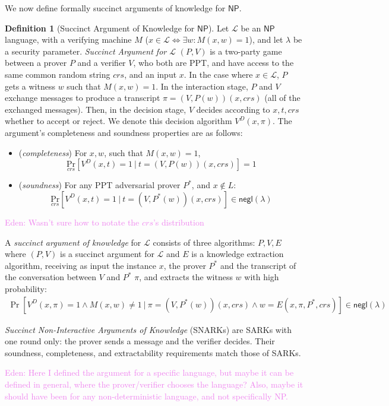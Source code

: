 \documentclass{llncs}
\numberwithin{equation}{section}
\numberwithin{figure}{section}
\theoremstyle{definition}
\newtheorem{definition}[theorem]{Definition}
\newcommand{\Enote}[1]{\textcolor{violet}{Eden: #1}}
\newcommand{\prob}[2]{\ensuremath{\underset{#1}{\text{Pr}}\left [#2\right ]}}
\newcommand{\negl}{\mathsf{negl}}
\newcommand{\Lan}{\ensuremath{\mathcal{L}}}
\newcommand{\NP}{\mathsf{NP}}
\begin{document}
We now define formally succinct arguments of knowledge for $\mathsf{NP}$.
\begin{definition} [Succinct Argument of Knowledge for $\NP$]
    Let $\Lan$ be an $\NP$ language, with a verifying machine $M$ ($x\in \Lan \Leftrightarrow \exists w: M(x,w)=1$), and let $\lambda$ be a security parameter. \emph{Succinct Argument for $\Lan$} $(P,V)$ is a two-party game between a prover $P$ and a verifier $V$, who both are PPT, and have access to the same common random string $crs$, and an input $x$. In the case where $x\in \Lan$, $P$ gets a witness $w$ such that $M(x,w)=1$. In the interaction stage, $P$ and $V$ exchange messages to produce a transcript $\pi = (V,P(w))(x,crs)$ (all of the exchanged messages). Then, in the decision stage, $V$ decides according to $x,t,crs$ whether to accept or reject. We denote this decision algorithm $V^D(x,\pi)$. The argument's completeness and soundness properties are as follows:
    \begin{itemize}
        \item (\emph{completeness}) For $x,w$, such that $M(x,w)=1$, $$\prob{crs}{V^D(x,t) = 1\ |\ t = (V,P(w))(x,crs)} = 1$$
        \item (\emph{soundness}) For any PPT adversarial prover $P^*$, and $x\notin L$: $$\prob{crs}{V^D(x,t) = 1\ |\ t = (V,P^*(w))(x,crs)} \in \negl(\lambda)$$
    \end{itemize}
    \Enote{Wasn't sure how to notate the $crs$'s distribution}
    
    A \emph{succinct argument of knowledge} for $\Lan$ consists of three algorithms: $P, V, E$ where $(P, V)$ is a succinct argument for $\Lan$ and $E$ is a knowledge extraction algorithm, receiving as input the instance $x$, the prover $P^*$ and the transcript of the conversation between $V$ and $P^*$ $\pi$, and extracts the witness $w$ with high probability:
    \begin{gather*}
        \Pr[V^D(x,\pi) = 1 \wedge M(x,w)\neq 1\ |\ \pi = (V,P^*(w))(x,crs) \wedge w = E(x, \pi, P^*, crs)] \in \negl(\lambda)
    \end{gather*}

    \emph{Succinct Non-Interactive Arguments of Knowledge} (SNARKs) are SARKs with one round only: the prover sends a message and the verifier decides. Their soundness, completeness, and extractability requirements match those of SARKs.
\end{definition}
\Enote{Here I defined the argument for a specific language, but maybe it can be defined in general, where the prover/verifier chooses the language? Also, maybe it should have been for any non-deterministic language, and not specifically NP.}
\end{document}
